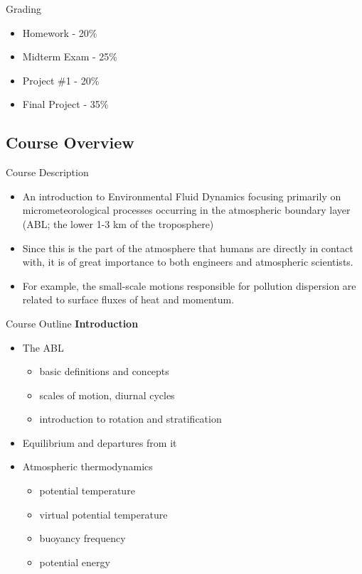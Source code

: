
\begin{frame}{Grading}
\begin{itemize}
\item Homework - 20\%
\item Midterm Exam - 25\%
\item Project \#1 - 20\%
\item Final Project - 35\%
\end{itemize}
\end{frame}

\subsection{Course Overview}
\begin{frame}{Course Description}
\begin{itemize}
\item An introduction to Environmental Fluid Dynamics focusing primarily on micrometeorological processes occurring in the atmospheric boundary layer (ABL; the lower 1-3 km of the troposphere)
\item Since this is the part of the atmosphere that humans are directly in contact with, it is of great importance to both engineers and atmospheric scientists.
\item For example, the small-scale motions responsible for pollution dispersion are related to surface fluxes of heat and momentum.
\end{itemize}

\end{frame}


\begin{frame}{Course Outline}
\textbf{Introduction}

\begin{itemize}
\item The ABL
	\begin{itemize}
		\item basic definitions and concepts
		\item scales of motion, diurnal cycles
		\item introduction to rotation and stratification
	\end{itemize}
	\item Equilibrium and departures from it
	\item Atmospheric thermodynamics
		\begin{itemize}
			\item potential temperature
			\item virtual potential temperature
			\item buoyancy frequency
			\item potential energy
		\end{itemize}
\end{itemize}
\end{frame}

